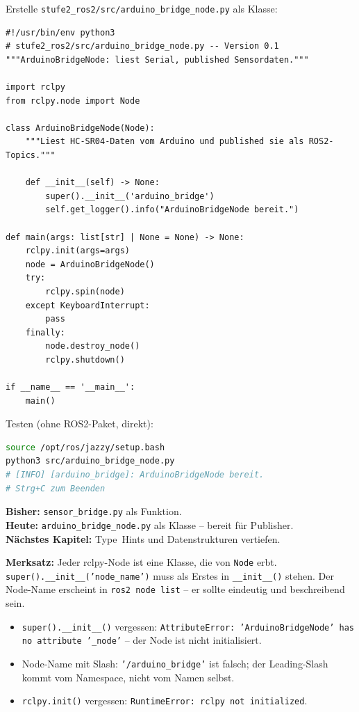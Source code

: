 \begin{loesungBox}
Erstelle \texttt{stufe2\_ros2/src/arduino\_bridge\_node.py} als Klasse:

\begin{lstlisting}
#!/usr/bin/env python3
# stufe2_ros2/src/arduino_bridge_node.py -- Version 0.1
"""ArduinoBridgeNode: liest Serial, published Sensordaten."""

import rclpy
from rclpy.node import Node

class ArduinoBridgeNode(Node):
    """Liest HC-SR04-Daten vom Arduino und published sie als ROS2-Topics."""

    def __init__(self) -> None:
        super().__init__('arduino_bridge')
        self.get_logger().info("ArduinoBridgeNode bereit.")

def main(args: list[str] | None = None) -> None:
    rclpy.init(args=args)
    node = ArduinoBridgeNode()
    try:
        rclpy.spin(node)
    except KeyboardInterrupt:
        pass
    finally:
        node.destroy_node()
        rclpy.shutdown()

if __name__ == '__main__':
    main()
\end{lstlisting}

Testen (ohne ROS2-Paket, direkt):
\begin{lstlisting}[language=bash]
source /opt/ros/jazzy/setup.bash
python3 src/arduino_bridge_node.py
# [INFO] [arduino_bridge]: ArduinoBridgeNode bereit.
# Strg+C zum Beenden
\end{lstlisting}
\end{loesungBox}

\begin{projektBox}
\textbf{Bisher:} \texttt{sensor\_bridge.py} als Funktion.\\
\textbf{Heute:} \texttt{arduino\_bridge\_node.py} als Klasse -- bereit für Publisher.\\
\textbf{Nächstes Kapitel:} Type~Hints und Datenstrukturen vertiefen.
\end{projektBox}

\begin{merksatzBox}
\textbf{Merksatz:} Jeder rclpy-Node ist eine Klasse, die von \texttt{Node} erbt.
\texttt{super().\_\_init\_\_('node\_name')} muss als Erstes in \texttt{\_\_init\_\_()} stehen.
Der Node-Name erscheint in \texttt{ros2 node list} -- er sollte eindeutig
und beschreibend sein.
\end{merksatzBox}

\begin{fehlerBox}
\begin{itemize}
\item \texttt{super().\_\_init\_\_()} vergessen:
  \texttt{AttributeError: 'ArduinoBridgeNode' has no attribute '\_node'} --
  der Node ist nicht initialisiert.
\item Node-Name mit Slash: \texttt{'/arduino\_bridge'} ist falsch;
  der Leading-Slash kommt vom Namespace, nicht vom Namen selbst.
\item \texttt{rclpy.init()} vergessen: \texttt{RuntimeError: rclpy not initialized}.
\end{itemize}
\end{fehlerBox}

